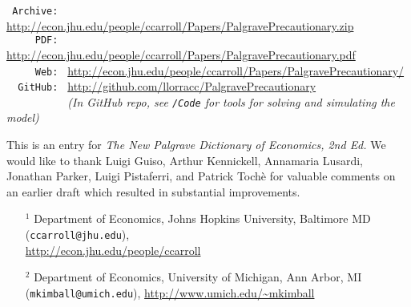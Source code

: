 \documentclass[12pt,letterpaper]{econtex}
\begin{document}
\begin{titlepage}
  \begin{small}
    \parbox{\textwidth}{
      \begin{center}
        \begin{tabbing}
          \texttt{~Archive:~} \= \= \url{http://econ.jhu.edu/people/ccarroll/Papers/PalgravePrecautionary.zip} \\
          \texttt{~~~~~PDF:~} \> \> \url{http://econ.jhu.edu/people/ccarroll/Papers/PalgravePrecautionary.pdf} \\
          \texttt{~~~~~Web:~} \> \>  \url{http://econ.jhu.edu/people/ccarroll/Papers/PalgravePrecautionary/}\\
          \texttt{~~GitHub:~} \> \> \url{http://github.com/llorracc/PalgravePrecautionary} \\
          \texttt{~~~~~~~~~~} \> \> \textit{(In GitHub repo, see \texttt{/Code} for tools for solving and simulating the model)} \\
        \end{tabbing}
      \end{center}
    }



  \noindent This is an entry for {\it The New Palgrave Dictionary of Economics, 2nd Ed.}  We would like to thank Luigi Guiso, Arthur Kennickell, Annamaria Lusardi, Jonathan Parker, Luigi Pistaferri,
  and Patrick Toch\`e for valuable comments on an earlier draft which resulted in substantial improvements.


  \begin{itemize}
  \item[$^1$] Department of Economics, Johns Hopkins University, Baltimore MD (\texttt{ccarroll@jhu.edu}),
    \\ \url{http://econ.jhu.edu/people/ccarroll}

  \item[$^2$] Department of Economics, University of Michigan, Ann Arbor, MI (\texttt{mkimball@umich.edu}), \url{http://www.umich.edu/~mkimball}
  \end{itemize}

  \end{small}          

\end{titlepage}


\setlength{\footskip}{36pt}

\pagestyle{plain}\thispagestyle{empty}

\titlepage
\end{document}
